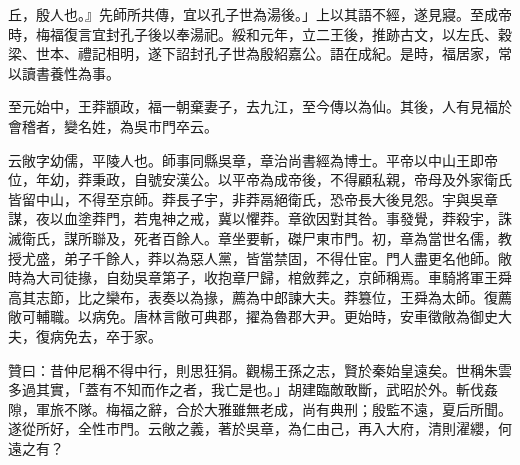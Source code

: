 \begin{pinyinscope}
丘，殷人也。』先師所共傳，宜以孔子世為湯後。」上以其語不經，遂見寢。至成帝時，梅福復言宜封孔子後以奉湯祀。綏和元年，立二王後，推跡古文，以左氏、穀梁、世本、禮記相明，遂下詔封孔子世為殷紹嘉公。語在成紀。是時，福居家，常以讀書養性為事。

至元始中，王莽顓政，福一朝棄妻子，去九江，至今傳以為仙。其後，人有見福於會稽者，變名姓，為吳市門卒云。

云敞字幼儒，平陵人也。師事同縣吳章，章治尚書經為博士。平帝以中山王即帝位，年幼，莽秉政，自號安漢公。以平帝為成帝後，不得顧私親，帝母及外家衛氏皆留中山，不得至京師。莽長子宇，非莽鬲絕衛氏，恐帝長大後見怨。宇與吳章謀，夜以血塗莽門，若鬼神之戒，冀以懼莽。章欲因對其咎。事發覺，莽殺宇，誅滅衛氏，謀所聯及，死者百餘人。章坐要斬，磔尸東市門。初，章為當世名儒，教授尤盛，弟子千餘人，莽以為惡人黨，皆當禁固，不得仕宦。門人盡更名他師。敞時為大司徒掾，自劾吳章第子，收抱章尸歸，棺斂葬之，京師稱焉。車騎將軍王舜高其志節，比之欒布，表奏以為掾，薦為中郎諫大夫。莽篡位，王舜為太師。復薦敞可輔職。以病免。唐林言敞可典郡，擢為魯郡大尹。更始時，安車徵敞為御史大夫，復病免去，卒于家。

贊曰：昔仲尼稱不得中行，則思狂狷。觀楊王孫之志，賢於秦始皇遠矣。世稱朱雲多過其實，「蓋有不知而作之者，我亡是也。」胡建臨敵敢斷，武昭於外。斬伐姦隙，軍旅不隊。梅福之辭，合於大雅雖無老成，尚有典刑；殷監不遠，夏后所聞。遂從所好，全性市門。云敞之義，著於吳章，為仁由己，再入大府，清則濯纓，何遠之有？


\end{pinyinscope}